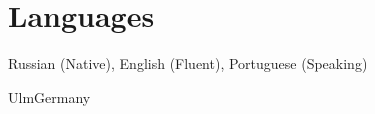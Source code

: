 \documentclass[11pt,a4paper,sans]{moderncv}        %
\begin{document}
		
		
		
		
		\section{Languages}
		Russian (Native), English (Fluent), Portuguese (Speaking)
		
		\vspace*{\fill}
		\name{}{}
		\title{}
		\address{Bismarckring, 64}{Ulm}{Germany}
		\makecvtitle
	
\end{document}
